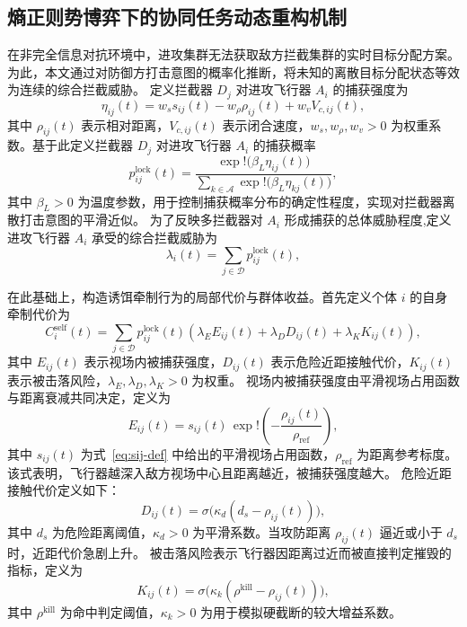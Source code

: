 \subsection{熵正则势博弈下的协同任务动态重构机制}

在非完全信息对抗环境中，进攻集群无法获取敌方拦截集群的实时目标分配方案。
为此，本文通过对防御方打击意图的概率化推断，将未知的离散目标分配状态等效为连续的综合拦截威胁。
定义拦截器 $D_j$ 对进攻飞行器 $A_i$ 的捕获强度为
\begin{equation}
\eta_{ij}(t)
=
w_s s_{ij}(t)
-
w_{\rho}\rho_{ij}(t)
+
w_v V_{c,ij}(t),
\end{equation}
其中 $\rho_{ij}(t)$ 表示相对距离，$V_{c,ij}(t)$ 表示闭合速度，$w_s,w_{\rho},w_v>0$ 为权重系数。基于此定义拦截器 $D_j$ 对进攻飞行器 $A_i$ 的捕获概率
\begin{equation}
p_{ij}^{\mathrm{lock}}(t)
=
\frac{\exp!\bigl(\beta_L \eta_{ij}(t)\bigr)}
{\sum\limits_{k\in\mathcal{A}}\exp!\bigl(\beta_L \eta_{kj}(t)\bigr)},
\label{eq:soft-lock-prob}
\end{equation}
其中 $\beta_L>0$ 为温度参数，用于控制捕获概率分布的确定性程度，实现对拦截器离散打击意图的平滑近似。
为了反映多拦截器对 $A_i$ 形成捕获的总体威胁程度,定义进攻飞行器 $A_i$ 承受的综合拦截威胁为
\begin{equation}
\lambda_i(t)
=
\sum_{j\in\mathcal D}p_{ij}^{\mathrm{lock}}(t),
\label{eq:soft-lock-pressure}
\end{equation}

在此基础上，构造诱饵牵制行为的局部代价与群体收益。首先定义个体 $i$ 的自身牵制代价为
\begin{equation}
C_i^{\mathrm{self}}(t)
=
\sum_{j\in\mathcal{D}}
p_{ij}^{\mathrm{lock}}(t)
\left(
\lambda_E E_{ij}(t)
+
\lambda_D D_{ij}(t)
+
\lambda_K K_{ij}(t)
\right),
\end{equation}
其中 $E_{ij}(t)$ 表示视场内被捕获强度，$D_{ij}(t)$ 表示危险近距接触代价，$K_{ij}(t)$ 表示被击落风险，$\lambda_E,\lambda_D,\lambda_K>0$ 为权重。
视场内被捕获强度由平滑视场占用函数与距离衰减共同决定，定义为
\begin{equation}
E_{ij}(t)
=
s_{ij}(t)\,\exp!\left(-\frac{\rho_{ij}(t)}{\rho_{\mathrm{ref}}}\right),
\end{equation}
其中 $s_{ij}(t)$ 为式~\eqref{eq:sij-def} 中给出的平滑视场占用函数，$\rho_{\mathrm{ref}}$ 为距离参考标度。该式表明，飞行器越深入敌方视场中心且距离越近，被捕获强度越大。
危险近距接触代价定义如下：
\begin{equation}
D_{ij}(t)
=
\sigma\!\bigl(\kappa_d(d_s-\rho_{ij}(t))\bigr),
\end{equation}
其中 $d_s$ 为危险距离阈值，$\kappa_d>0$ 为平滑系数。当攻防距离 $\rho_{ij}(t)$ 逼近或小于 $d_s$ 时，近距代价急剧上升。
被击落风险表示飞行器因距离过近而被直接判定摧毁的指标，定义为
\begin{equation}
K_{ij}(t)
=
\sigma\!\bigl(\kappa_k(\rho^{\mathrm{kill}}-\rho_{ij}(t))\bigr),
\end{equation}
其中 $\rho^{\mathrm{kill}}$ 为命中判定阈值，$\kappa_k>0$ 为用于模拟硬截断的较大增益系数。

